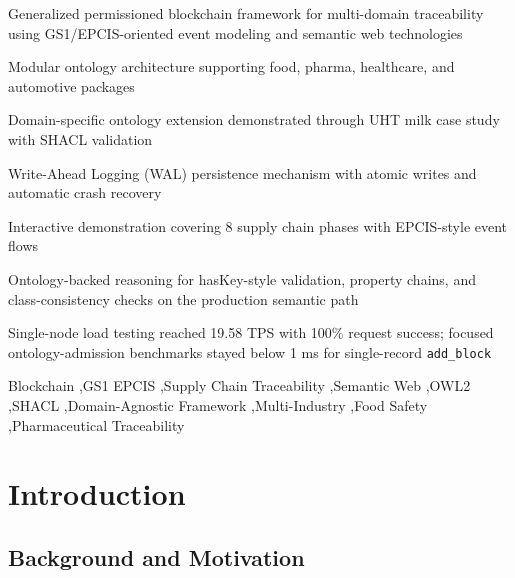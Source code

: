\documentclass[preprint,review,12pt,authoryear]{elsarticle}
\begin{document}
\begin{frontmatter}
\begin{highlights}
\item Generalized permissioned blockchain framework for multi-domain traceability using GS1/EPCIS-oriented event modeling and semantic web technologies
\item Modular ontology architecture supporting food, pharma, healthcare, and automotive packages
\item Domain-specific ontology extension demonstrated through UHT milk case study with SHACL validation
\item Write-Ahead Logging (WAL) persistence mechanism with atomic writes and automatic crash recovery
\item Interactive demonstration covering 8 supply chain phases with EPCIS-style event flows
\item Ontology-backed reasoning for hasKey-style validation, property chains, and class-consistency checks on the production semantic path
\item Single-node load testing reached 19.58 TPS with 100\% request success; focused ontology-admission benchmarks stayed below 1 ms for single-record \texttt{add\_block}
\end{highlights}

\begin{keyword}
Blockchain \sep GS1 EPCIS \sep Supply Chain Traceability \sep Semantic Web \sep OWL2 \sep SHACL \sep Domain-Agnostic Framework \sep Multi-Industry \sep Food Safety \sep Pharmaceutical Traceability
\end{keyword}

\end{frontmatter}
\hypersetup{pageanchor=true}

\linenumbers

\section{Introduction}\label{sec:introduction}

\subsection{Background and Motivation}
\end{document}
